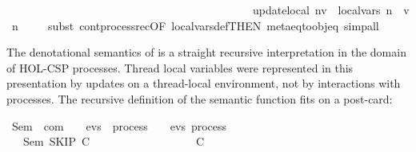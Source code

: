 \begin{isabellebody}
\ \ \ \ \ \ \ \ \ \ \ \ \ \ \ \ \ \ \ \ \ \ \ \ \ \ \ \ \ \ \ \ \ \ \ \ \ \ \ \ \ \ \ {\isasymbox}\ {\isacharparenleft}{\kern0pt}{\isacharparenleft}{\kern0pt}update\isactrlsub l\isactrlsub o\isactrlsub c\isactrlsub a\isactrlsub l\ n{\isacharparenright}{\kern0pt}\isactrlbold {\isacharquery}{\kern0pt}v\ {\isasymrightarrow}\ local{\isacharunderscore}{\kern0pt}vars\ {\isacharparenleft}{\kern0pt}{\isasymsigma}{\isacharparenleft}{\kern0pt}n\ {\isacharcolon}{\kern0pt}{\isacharequal}{\kern0pt}\ v{\isacharparenright}{\kern0pt}{\isacharparenright}{\kern0pt}\ n{\isacharparenright}{\kern0pt}{\isacartoucheclose}\ \isanewline
%
\isadelimproof
\ \ %
\endisadelimproof
%
\isatagproof
{}\isamarkupfalse%
\ {\isacharparenleft}{\kern0pt}subst\ cont{\isacharunderscore}{\kern0pt}process{\isacharunderscore}{\kern0pt}rec{\isacharbrackleft}{\kern0pt}OF\ local{\isacharunderscore}{\kern0pt}vars{\isacharunderscore}{\kern0pt}def{\isacharbrackleft}{\kern0pt}THEN\ meta{\isacharunderscore}{\kern0pt}eq{\isacharunderscore}{\kern0pt}to{\isacharunderscore}{\kern0pt}obj{\isacharunderscore}{\kern0pt}eq{\isacharbrackright}{\kern0pt}{\isacharbrackright}{\kern0pt}{\isacharparenright}{\kern0pt}\ simp{\isacharunderscore}{\kern0pt}all%
\endisatagproof
{\isafoldproof}%
%
\isadelimproof
%
\endisadelimproof
%
\isadelimdocument
%
\endisadelimdocument
%
\isatagdocument
%
\isamarkuptrue%
%
\endisatagdocument
{\isafolddocument}%
%
\isadelimdocument
%
\endisadelimdocument
%
\begin{isamarkuptext}%
The denotational semantics of  is a straight recursive interpretation 
in the domain of HOL-CSP processes. Thread local variables were represented in this 
presentation by updates on a thread-local environment, not by interactions with processes.
The recursive definition of the semantic function fits on a post-card:%
\end{isamarkuptext}\isamarkuptrue%
\isamarkupfalse%
\ Sem\ {\isacharcolon}{\kern0pt}{\isacharcolon}{\kern0pt}\ {\isachardoublequoteopen}com\ {\isasymRightarrow}\ {\isacharparenleft}{\kern0pt}{\isasymsigma}\ {\isasymRightarrow}\ evs\ \ process{\isacharparenright}{\kern0pt}\ {\isasymRightarrow}\ {\isasymsigma}\ {\isasymRightarrow}\ evs\ process{\isachardoublequoteclose}\ \isanewline
\ \ \ {\isachardoublequoteopen}Sem\ SKIP\ C\ \ \ \ \ \ \ \ \ \ \ \ \ \ \ \ \ \ {\isacharequal}{\kern0pt}\ C{\isachardoublequoteclose}\ \isanewline

\end{isabellebody}
